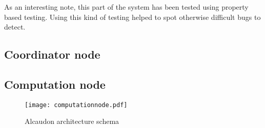 As an interesting note, this part of the system has been tested using property
based testing\cite{quickcheck}. Using this kind of testing helped to spot
otherwise difficult bugs to detect.

\subsection{Coordinator node}

\subsection{Computation node}

\begin{figure}[!h]
  \centering
  \texttt{[image: computationnode.pdf]}
  \caption{Alcaudon architecture schema}
  \label{fig:computationnode}
\end{figure}

